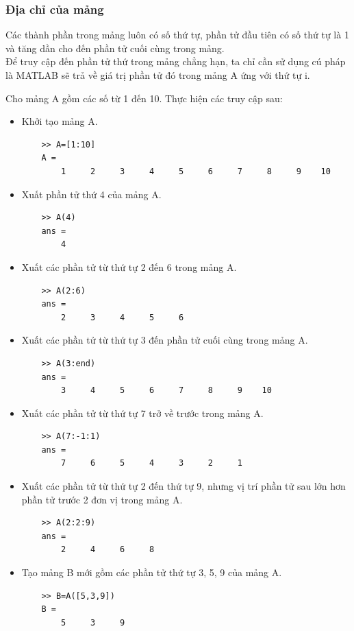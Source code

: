 \documentclass[12pt,a4paper]{article}
\begin{document}
\subsubsection{Địa chỉ của mảng}
Các thành phần trong mảng luôn có số thứ tự, phần tử đầu tiên có số thứ tự là 1 và tăng dần cho đến phần tử cuối cùng trong mảng.\\
Để truy cập đến phần tử thứ  trong mảng  chẳng hạn, ta chỉ cần sử dụng cú pháp  là MATLAB sẽ trả về giá trị phần tử đó trong mảng A ứng với thứ tự i. 
\begin{example}
Cho mảng A gồm các số từ 1 đến 10. Thực hiện các truy cập sau:
\begin{itemize}
	\item Khởi tạo mảng A.
\begin{lstlisting}
	>> A=[1:10]
	A =
     	1     2     3     4     5     6     7     8     9    10
\end{lstlisting}
	\item Xuất phần tử thứ 4 của mảng A.
\begin{lstlisting}
	>> A(4)
	ans =
     	4
\end{lstlisting}
	\item Xuất các phần tử từ thứ tự 2 đến 6 trong mảng A.
\begin{lstlisting}
	>> A(2:6)
	ans =
     	2     3     4     5     6
\end{lstlisting}
	\item Xuất các phần tử từ thứ tự 3 đến phần tử cuối cùng trong mảng A.
\begin{lstlisting}
	>> A(3:end)
	ans =
     	3     4     5     6     7     8     9    10
\end{lstlisting}
	\item Xuất các phần tử từ thứ tự 7 trở về trước trong mảng A.
\begin{lstlisting}
	>> A(7:-1:1)
	ans =
     	7     6     5     4     3     2     1
\end{lstlisting}
	\item Xuất các phần tử từ thứ tự 2 đến thứ tự 9, nhưng vị trí phần tử sau lớn hơn phần tử trước 2 đơn vị trong mảng A.
\begin{lstlisting}
	>> A(2:2:9)
	ans =
     	2     4     6     8
\end{lstlisting}
	\item Tạo mảng B mới gồm các phần tử thứ tự 3, 5, 9 của mảng A.
\begin{lstlisting}
	>> B=A([5,3,9])
	B =
     	5     3     9
\end{lstlisting}
\end{itemize}	
\end{example}
\end{document}
